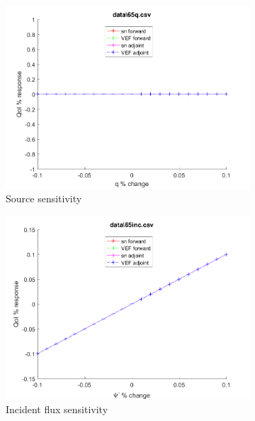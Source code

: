 \documentclass{article}
\begin{document}
\begin{figure}[H]
\label{Case65Sens}
\centering
\begin{subfigure}{.5\textwidth}
  \centering
  \includegraphics[width=.98\linewidth]{IanProposal/figures2/65qSens.png}
  \caption{Source sensitivity}
  \label{fig:sfig1}
\end{subfigure}%
\begin{subfigure}{.5\textwidth}
  \centering
  \includegraphics[width=.98\linewidth]{IanProposal/figures2/65incSens.png}
  \caption{Incident flux sensitivity}
  \label{fig:sfig4}
\end{subfigure}%
\\
\begin{subfigure}{.5\textwidth}
  \centering

\end{subfigure}
\end{figure}
\end{document}
